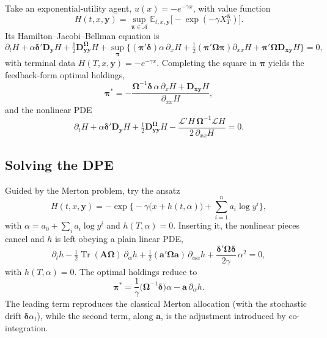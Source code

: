 \documentclass[11pt]{article}
\newcommand{\E}{\mathbb{E}}
\DeclareMathOperator{\Tr}{Tr}
\DeclareMathOperator*{\supop}{sup}
\begin{document}
Take an exponential-utility agent, $u(x) = -e^{-\gamma x}$, with value function
\begin{equation*}
  H(t,x,\bm y) = \supop_{\bm\pi\in\mathcal A}\E_{t,x,\bm y}\big[-\exp(-\gamma X^{\bm\pi}_T)\big].
\end{equation*}
Its Hamilton--Jacobi--Bellman equation is
\begin{equation}
  \partial_t H + \alpha\bm\delta'\bm D_{\bm y}H + \tfrac12 \bm D^{\bm\Omega}_{\bm{yy}}H
    + \supop_{\bm\pi}\Big\{(\bm\pi'\bm\delta)\alpha\,\partial_x H
    + \tfrac12(\bm\pi'\bm\Omega\bm\pi)\partial_{xx}H + \bm\pi'\bm\Omega\bm D_{\bm{xy}}H\Big\} = 0,
\end{equation}
with terminal data $H(T,x,\bm y) = -e^{-\gamma x}$. Completing the square in $\bm\pi$ yields the
feedback-form optimal holdings,
\begin{equation}\label{eq:117}
  \bm\pi^* = -\frac{\bm\Omega^{-1}\bm\delta\,\alpha\,\partial_x H + \bm D_{\bm{xy}}H}{\partial_{xx}H}, \tag{11.7}
\end{equation}
and the nonlinear PDE
\begin{equation}\label{eq:118}
  \partial_t H + \alpha\bm\delta'\bm D_{\bm y}H + \tfrac12 \bm D^{\bm\Omega}_{\bm{yy}}H
    - \frac{\mathcal{L}'H\,\bm\Omega^{-1}\mathcal{L}H}{2\,\partial_{xx}H} = 0. \tag{11.8}
\end{equation}

\subsection{Solving the DPE}

Guided by the Merton problem, try the ansatz
\begin{equation}
  H(t,x,\bm y) = -\exp\Big\{-\gamma\big(x + h(t,\alpha)\big) + \sum_{i=1}^n a_i \log y^i\Big\},
\end{equation}
with $\alpha = a_0 + \sum_i a_i \log y^i$ and $h(T,\alpha)=0$. Inserting it, the nonlinear pieces cancel
and $h$ is left obeying a plain linear PDE,
\begin{equation}\label{eq:1110}
  \partial_t h - \tfrac12\Tr(\bm A\bm\Omega)\,\partial_\alpha h + \tfrac12(\bm a'\bm\Omega\bm a)\,
    \partial_{\alpha\alpha}h + \frac{\bm\delta'\bm\Omega\bm\delta}{2\gamma}\,\alpha^2 = 0, \tag{11.10}
\end{equation}
with $h(T,\alpha)=0$. The optimal holdings reduce to
\begin{equation}\label{eq:1111}
  \bm\pi^* = \frac1\gamma\big(\bm\Omega^{-1}\bm\delta\big)\alpha - \bm a\,\partial_\alpha h. \tag{11.11}
\end{equation}
The leading term reproduces the classical Merton allocation (with the stochastic drift
$\bm\delta\alpha_t$), while the second term, along $\bm a$, is the adjustment introduced by
co-integration.
\end{document}
